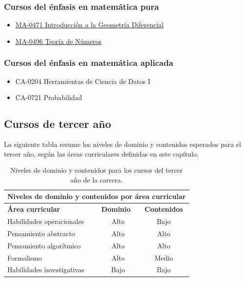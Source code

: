 \subsubsection*{Cursos del énfasis en matemática pura}
\begin{itemize}
    \item \hyperlink{MA0471}{MA-0471 Introducción a la Geometría Diferencial}
    \item \hyperlink{MA0496}{MA-0496 Teoría de Números}
\end{itemize}

\subsubsection*{Cursos del énfasis en matemática aplicada}
\begin{itemize}
    \item {CA-0204 Herramientas de Ciencia de Datos I}
    \item {CA-0721 Probabilidad}
\end{itemize}




\subsection{Cursos de tercer año}

La siguiente tabla resume los niveles de dominio y contenidos esperados para el tercer año, según las áreas curriculares definidas en este capítulo.

\begin{table}[H]
\begin{center}
\begin{tabular}{|ccc|}
\hline
\multicolumn{3}{|c|}{\cellcolor[HTML]{00C0F3} \textbf{Niveles de dominio y contenidos por área curricular}} \\ \hline
\multicolumn{1}{|l|}{\cellcolor[HTML]{8ED8F8}\textbf{Área curricular}} & \multicolumn{1}{l|}{\cellcolor[HTML]{8ED8F8}\textbf{Dominio}} & \cellcolor[HTML]{8ED8F8}\textbf{Contenidos} \\ \hline
\multicolumn{1}{|l|}{Habilidades operacionales} & \multicolumn{1}{c|}{Alto} & Bajo \\ \hline
\multicolumn{1}{|l|}{Pensamiento abstracto} & \multicolumn{1}{c|}{Alto} & Alto \\ \hline
\multicolumn{1}{|l|}{Pensamiento algorítmico} & \multicolumn{1}{c|}{Alto} & Alto \\ \hline
\multicolumn{1}{|l|}{Formalismo} & \multicolumn{1}{c|}{Alto} & Medio \\ \hline
\multicolumn{1}{|l|}{Habilidades investigativas} & \multicolumn{1}{c|}{Bajo} & Bajo \\ \hline
\end{tabular}
\end{center}
\caption{Niveles de dominio y contenidos para los cursos del tercer año de la carrera.}
\end{table}

